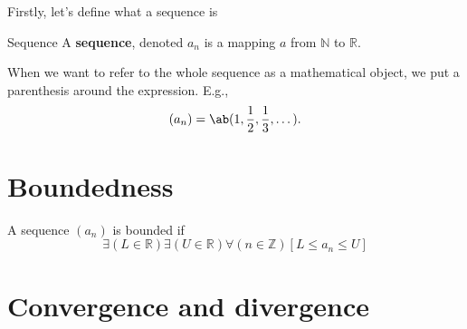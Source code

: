 Firstly, let's define what a sequence is
\begin{df}{Sequence}{}
A \textbf{sequence}, denoted $a_n$ is a mapping $a$ from $\mathbb{N}$ to $\mathbb{R}$.
\end{df}
When we want to refer to the whole sequence as a mathematical object, we put a parenthesis around the expression. E.g.,
\begin{gather*}
  (a_n) = \ab(1, \frac{1}{2}, \frac{1}{3}, \dots).
\end{gather*}

\section{Boundedness}

\begin{df}
  A sequence $(a_n)$ is bounded if
  \begin{equation}
    \exists(L \in \mathbb{R})\exists(U \in \mathbb{R})\forall (n \in \mathbb{Z})[L \leq a_n \leq U]
  \end{equation}
\end{df}

\section{Convergence and divergence}
